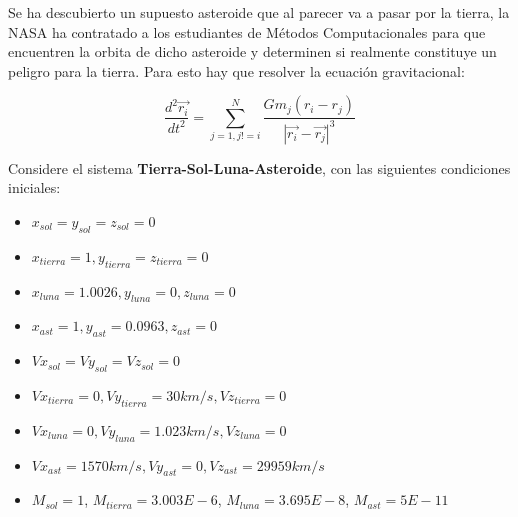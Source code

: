 \documentclass[11pt,letterpaper]{exam}
\begin{document}
\vspace{0.5cm}

\begin{questions}


Se ha descubierto un supuesto asteroide que al parecer va a pasar por la tierra, la NASA ha contratado a los estudiantes de Métodos Computacionales para que encuentren la orbita de dicho asteroide y determinen si realmente constituye un peligro para la tierra. Para esto hay que resolver la ecuación gravitacional: 
 
\begin{equation}\label{eq:force}
\dfrac{d^2\vec{r_i}}{dt^2} = \sum_{j=1, j!=i}^{N} \dfrac{Gm_j (r_i-r_j)}{|\vec{r_i}-\vec{r_j}|^3}
\end{equation}   

Considere el sistema \textbf{Tierra-Sol-Luna-Asteroide}, con las siguientes condiciones iniciales:

\begin{itemize}

\item $x_{sol}=y_{sol}=z_{sol}=0$

\item $x_{tierra} = 1, y_{tierra}=z_{tierra}=0$

\item $x_{luna} = 1.0026, y_{luna}=0, z_{luna}=0$

\item $x_{ast} = 1, y_{ast}=0.0963, z_{ast}=0$

\item $Vx_{sol}=Vy_{sol}=Vz_{sol}=0$

\item $Vx_{tierra} = 0, Vy_{tierra}=30 km/s, Vz_{tierra}=0$

\item $Vx_{luna} = 0, Vy_{luna}=1.023 km/s, Vz_{luna}=0$

\item $Vx_{ast} = 1570 km/s, Vy_{ast}=0, Vz_{ast}=29959 km/s$

\item $M_{sol} = 1$, $M_{tierra}=3.003E-6$, $M_{luna}=3.695E-8$, $M_{ast} = 5E-11$
\end{itemize}


\end{questions}
\end{document}
